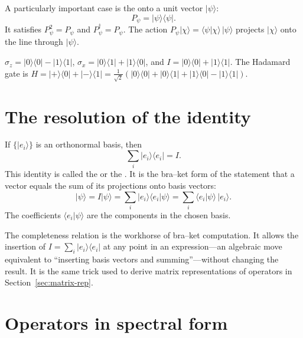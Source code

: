 A particularly important case is the  onto a unit vector $|\psi\rangle$:
\[
  P_\psi = |\psi\rangle\langle\psi|.
\]
It satisfies $P_\psi^2 = P_\psi$ and $P_\psi^\dagger = P_\psi$. The action $P_\psi|\chi\rangle = \langle\psi|\chi\rangle\,|\psi\rangle$ projects $|\chi\rangle$ onto the line through $|\psi\rangle$.

\begin{example}
$\sigma_z = |0\rangle\langle 0| - |1\rangle\langle 1|$, $\sigma_x = |0\rangle\langle 1| + |1\rangle\langle 0|$, and $I = |0\rangle\langle 0| + |1\rangle\langle 1|$. The Hadamard gate is $H = |+\rangle\langle 0| + |-\rangle\langle 1| = \tfrac{1}{\sqrt 2}(|0\rangle\langle 0| + |0\rangle\langle 1| + |1\rangle\langle 0| - |1\rangle\langle 1|)$.
\end{example}

\section{The resolution of the identity}

If $\{|e_i\rangle\}$ is an orthonormal basis, then
\[
  \sum_i |e_i\rangle\langle e_i| = I.
\]
This identity is called the  or the . It is the bra--ket form of the statement that a vector equals the sum of its projections onto basis vectors:
\[
  |\psi\rangle = I|\psi\rangle = \sum_i |e_i\rangle\langle e_i|\psi\rangle = \sum_i \langle e_i|\psi\rangle\,|e_i\rangle.
\]
The coefficients $\langle e_i|\psi\rangle$ are the components in the chosen basis.

The completeness relation is the workhorse of bra--ket computation. It allows the insertion of $I = \sum_i |e_i\rangle\langle e_i|$ at any point in an expression---an algebraic move equivalent to ``inserting basis vectors and summing''---without changing the result. It is the same trick used to derive matrix representations of operators in Section~\ref{sec:matrix-rep}.

\section{Operators in spectral form}

